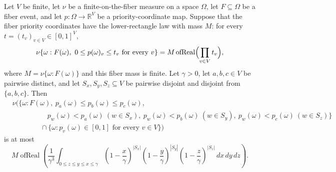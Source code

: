 \begin{helper}
Let \(V\) be finite, let \(\nu\) be a finite-on-the-fiber measure on a space
\(\Omega\), let \(F\subseteq\Omega\) be a fiber event, and let
\(p:\Omega\to\mathbb R^V\) be a priority-coordinate map.  Suppose that the
fiber priority coordinates have the lower-rectangle law with mass \(M\):
for every \(t=(t_v)_{v\in V}\in[0,1]^V\),
\[
\nu\{\omega:F(\omega),\ 0\le p(\omega)_v\le t_v\text{ for every }v\}
=M\operatorname{ofReal}\Bigl(\prod_{v\in V}t_v\Bigr),
\]
where \(M=\nu\{\omega:F(\omega)\}\) and this fiber mass is finite.  Let
\(\gamma>0\), let \(a,b,c\in V\) be pairwise distinct, and let
\(S_x,S_y,S_z\subseteq V\) be pairwise disjoint and disjoint from
\(\{a,b,c\}\).  Then
\[
\begin{aligned}
&\nu\bigl(\{\omega:F(\omega),\ p_a(\omega)\le p_b(\omega)\le p_c(\omega),\\
&\qquad\qquad\quad
  p_w(\omega)<p_a(\omega)\ (w\in S_x),\
  p_w(\omega)<p_b(\omega)\ (w\in S_y),\
  p_w(\omega)<p_c(\omega)\ (w\in S_z)\}\\
&\qquad\qquad\cap\{\omega:p_v(\omega)\in[0,1]\text{ for every }v\in V\}\bigr)
\end{aligned}
\]
is at most
\[
M\operatorname{ofReal}\left(
\frac{1}{\gamma^3}
\int_{0\le z\le y\le x\le\gamma}
\left(1-\frac{x}{\gamma}\right)^{|S_x|}
\left(1-\frac{y}{\gamma}\right)^{|S_y|}
\left(1-\frac{z}{\gamma}\right)^{|S_z|}\,dx\,dy\,dz\right).
\]
\end{helper}
